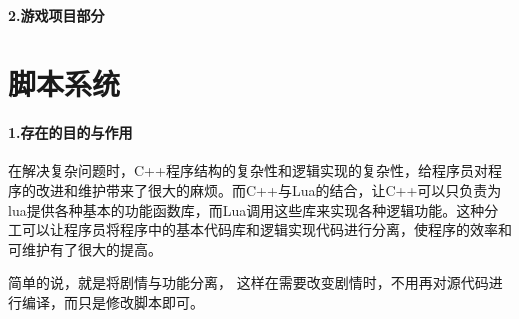 \documentclass[UTF8,a4paper,8pt]{ctexart}
\begin{document}
	  \paragraph{2.游戏项目部分}
	  
\section{脚本系统}
	\paragraph{1.存在的目的与作用}
		在解决复杂问题时，C++程序结构的复杂性和逻辑实现的复杂性，给程序员对程序的改进和维护带来了很大的麻烦。而C++与Lua的结合，让C++可以只负责为lua提供各种基本的功能函数库，而Lua调用这些库来实现各种逻辑功能。这种分工可以让程序员将程序中的基本代码库和逻辑实现代码进行分离，使程序的效率和可维护有了很大的提高。
		
		简单的说，就是将剧情与功能分离， 这样在需要改变剧情时，不用再对源代码进行编译，而只是修改脚本即可。
  
\end{document}
